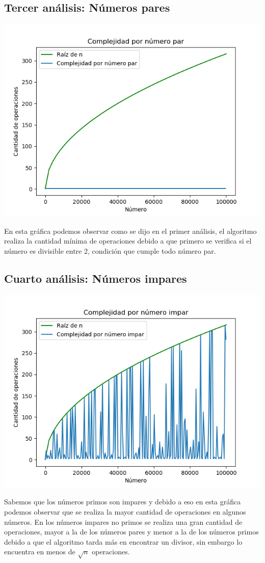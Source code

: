 \subsection{Tercer an\'alisis: N\'umeros pares}
\begin{center}
	\includegraphics[scale=0.6]{NumerosPares.png}
\end{center}
En esta gr\'afica podemos observar como se dijo en el primer an\'alisis, el algoritmo realiza la cantidad m\'inima de operaciones debido a que primero se verifica si el n\'umero es divisible entre 2, condici\'on que cumple todo n\'umero par.


\subsection{Cuarto an\'alisis: N\'umeros impares}
\begin{center}
	\includegraphics[scale=0.6]{NumerosImparesconPrimos.png}
\end{center}
Sabemos que los n\'umeros primos son impares y debido a eso en esta gr\'afica podemos observar que se realiza la mayor cantidad de operaciones en algunos n\'umeros. En los n\'umeros impares no primos se realiza una gran cantidad de operaciones, mayor a la de los n\'umeros pares y menor a la de los n\'umeros primos debido a que el algoritmo tarda m\'as en encontrar un divisor, sin embargo lo encuentra en menos de $\sqrt{n}$ operaciones.

